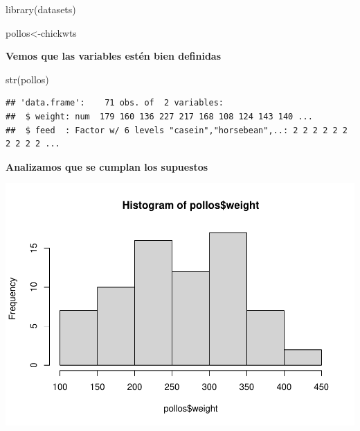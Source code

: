 \documentclass[
]{book}
\newenvironment{Shaded}{\begin{snugshade}}{\end{snugshade}}
\newcommand{\DocumentationTok}[1]{\textcolor[rgb]{0.56,0.35,0.01}{\textbf{\textit{#1}}}}
\newcommand{\FunctionTok}[1]{\textcolor[rgb]{0.00,0.00,0.00}{#1}}
\newcommand{\NormalTok}[1]{#1}
\newcommand{\OtherTok}[1]{\textcolor[rgb]{0.56,0.35,0.01}{#1}}
\newcommand{\SpecialCharTok}[1]{\textcolor[rgb]{0.00,0.00,0.00}{#1}}
\begin{document}
\begin{Shaded}
\begin{Highlighting}[]
\FunctionTok{library}\NormalTok{(datasets)}

\NormalTok{pollos}\OtherTok{\textless{}{-}}\NormalTok{chickwts}
\end{Highlighting}
\end{Shaded}

\textbf{Vemos que las variables estén bien definidas}

\begin{Shaded}
\begin{Highlighting}[]
\FunctionTok{str}\NormalTok{(pollos)}
\end{Highlighting}
\end{Shaded}

\begin{verbatim}
## 'data.frame':    71 obs. of  2 variables:
##  $ weight: num  179 160 136 227 217 168 108 124 143 140 ...
##  $ feed  : Factor w/ 6 levels "casein","horsebean",..: 2 2 2 2 2 2 2 2 2 2 ...
\end{verbatim}

\textbf{Analizamos que se cumplan los supuestos}

\begin{Shaded}
\end{Shaded}

\includegraphics{Esatadistica_en_R_files/figure-latex/unnamed-chunk-201-1.pdf}
\end{document}
